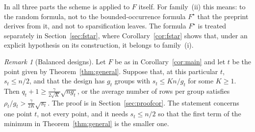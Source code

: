 \documentclass[11pt,a4paper]{article}
\theoremstyle{definition}
\theoremstyle{remark}
\newtheorem{remark}[theorem]{Remark}
\begin{document}
In all three parts the scheme is applied to $F$ itself. For family~(ii) this means: to the
random formula, not to the bounded-occurrence formula $F^\star$ that the preprint derives
from it, and not to sparsification leaves. The formula $F^\star$ is treated separately in
Section~\ref{sec:fstar}, where Corollary~\ref{cor:fstar} shows that, under an explicit
hypothesis on its construction, it belongs to family~(i).

\begin{remark}[Balanced designs]\label{rem:balanced}
Let $F$ be as in Corollary~\ref{cor:main} and let $t$ be the point given by
Theorem~\ref{thm:general}. Suppose that, at this particular $t$, $s_t\le n/2$, and that the
design has $g_t$ groups with $s_t\le Kn/g_t$ for some $K\ge1$. Then
$q_t+1\ge\frac{\gamma}{2\sqrt K}\sqrt{ng_t}$, or the average number of rows per group
satisfies $\rho_t/g_t>\frac{\gamma}{2K}\sqrt{s_t}$. The proof is in
Section~\ref{sec:proofcor}. The statement concerns one point $t$, not every point, and it
needs $s_t\le n/2$ so that the first term of the minimum in Theorem~\ref{thm:general} is the
smaller one.
\end{remark}
\end{document}
